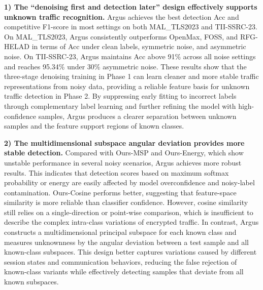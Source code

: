 \documentclass{SCIS2026}
\begin{document}
\textbf{1) The ``denoising first and detection later'' design effectively supports unknown traffic recognition.}
Argus achieves the best detection Acc and competitive F1-score in most settings on both MAL\_TLS2023 and TII-SSRC-23. On MAL\_TLS2023, Argus consistently outperforms OpenMax, FOSS, and RFG-HELAD in terms of Acc under clean labels, symmetric noise, and asymmetric noise. On TII-SSRC-23, Argus maintains Acc above 91\% across all noise settings and reaches 95.34\% under 30\% asymmetric noise. These results show that the three-stage denoising training in Phase 1 can learn cleaner and more stable traffic representations from noisy data, providing a reliable feature basis for unknown traffic detection in Phase 2. By suppressing early fitting to incorrect labels through complementary label learning and further refining the model with high-confidence samples, Argus produces a clearer separation between unknown samples and the feature support regions of known classes.

\textbf{2) The multidimensional subspace angular deviation provides more stable detection.}
Compared with Ours-MSP and Ours-Energy, which show unstable performance in several noisy scenarios, Argus achieves more robust results. This indicates that detection scores based on maximum softmax probability or energy are easily affected by model overconfidence and noisy-label contamination. Ours-Cosine performs better, suggesting that feature-space similarity is more reliable than classifier confidence. However, cosine similarity still relies on a single-direction or point-wise comparison, which is insufficient to describe the complex intra-class variations of encrypted traffic. In contrast, Argus constructs a multidimensional principal subspace for each known class and measures unknownness by the angular deviation between a test sample and all known-class subspaces. This design better captures variations caused by different session states and communication behaviors, reducing the false rejection of known-class variants while effectively detecting samples that deviate from all known subspaces.
\end{document}
